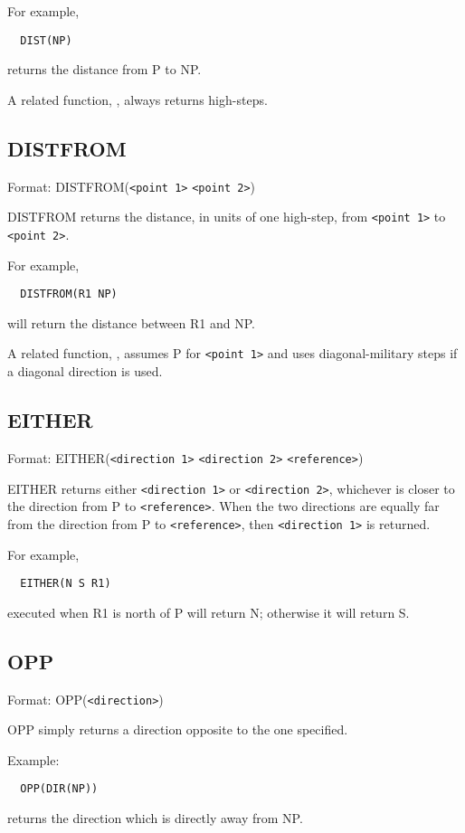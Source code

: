 For example,
\begin{verbatim}
  DIST(NP)
\end{verbatim}
returns the distance from P to NP.

A related function, , always returns high-steps.

\subsection{DISTFROM}\label{distfrom}

Format: DISTFROM(\verb$<point 1>$ \verb$<point 2>$)

DISTFROM returns the distance, in units of one high-step, from \verb$<point 1>$
to \verb$<point 2>$.

For example,
\begin{verbatim}
  DISTFROM(R1 NP)
\end{verbatim}
will return the distance between R1 and NP.

A related function, , assumes P for \verb$<point 1>$ and
uses diagonal-military steps if a diagonal direction is used.

\subsection{EITHER}\label{either}

Format: EITHER(\verb$<direction 1>$ \verb$<direction 2>$ \verb$<reference>$)

EITHER returns either \verb$<direction 1>$ or \verb$<direction 2>$, whichever
is closer to the direction from P to \verb$<reference>$.  When the two
directions are equally far from the direction from P to \verb$<reference>$,
then \verb$<direction 1>$ is returned.

For example,
\begin{verbatim}
  EITHER(N S R1)
\end{verbatim}
executed when R1 is north of P will return N; otherwise it will return S.

\subsection{OPP}\label{opp}

Format: OPP(\verb$<direction>$)

OPP simply returns a direction opposite to the one specified.

Example:
\begin{verbatim}
  OPP(DIR(NP))
\end{verbatim}
returns the direction which is directly away from NP.

